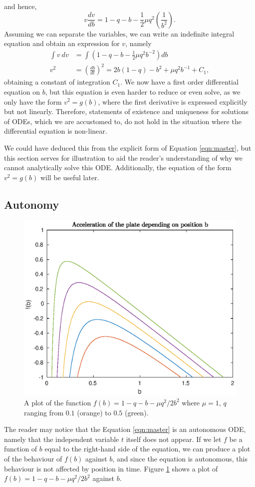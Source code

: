 \documentclass{article}
\begin{document}
and hence,
\begin{equation}
    v \frac{dv}{db} = 1 - q - b - \frac{1}{2}\mu q^2\left( \frac{1}{b^2} \right).
\end{equation}
Assuming we can separate the variables, we can write an indefinite integral equation and obtain an expression for $v$, namely
\begin{equation}
    \begin{aligned}
        \int v~dv &= \int \left(1 - q - b - \frac{1}{2}\mu q^2 b^{-2} \right) db \\  %
        v^2 &= \left(\frac{db}{dt}\right)^2 = 2b(1-q) - {b^2} + \mu q^2 b^{-1} + C_1, %
    \end{aligned}
    \label{eqn:first_order_reduction}
\end{equation}
obtaining a constant of integration $C_1$.
We now have a first order differential equation on $b$, %
but this equation is even harder to reduce or even solve, as we only have the form $v^2 = g(b)$,
where the first derivative is expressed explicitly but not linearly.
Therefore, statements of existence and uniqueness for solutions of ODEs,
which we are accustomed to,
do not hold in the situation where the differential equation is non-linear.

We could have deduced this from the explicit form of Equation \ref{eqn:master},
but this section serves for illustration to aid the reader's understanding of why we cannot analytically solve this ODE.
Additionally, the equation of the form $v^2 = g(b)$ will be useful later.

\subsection{Autonomy}

\begin{figure}[h!]
    \centering
    \includegraphics[width=0.5\linewidth]{f_plot_mu_1_q_vary}
    \caption{A plot of the function $f(b) = 1-q-b-\mu q^2/2b^2$ where $\mu=1$, $q$ ranging from $0.1$ (orange) to $0.5$ (green).}
    \label{fig:acc_b_plot}
\end{figure}
The reader may notice that the Equation \ref{eqn:master} is an autonomous ODE,
namely that the independent variable $t$ itself does not appear.
If we let $f$ be a function of $b$ equal to the right-hand side of the equation,
we can produce a plot of the behaviour of $f(b)$ against $b$,
and since the equation is autonomous, this behaviour is not affected by position in time.
Figure \ref{fig:acc_b_plot} shows a plot of $f(b)= 1 - q - b - \mu q^2/2b^2$ against $b$.
\end{document}

